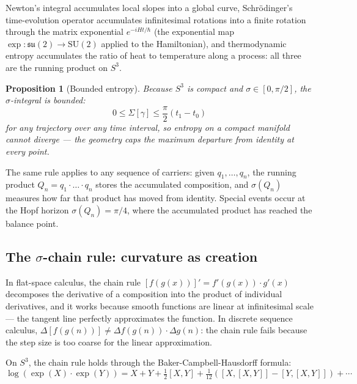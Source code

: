 \documentclass[12pt]{article}
\newtheorem{proposition}[theorem]{Proposition}
\begin{document}
Newton's integral accumulates local slopes into a global curve, Schr\"odinger's time-evolution operator accumulates infinitesimal rotations into a finite rotation through the matrix exponential $e^{-iHt/\hbar}$ (the exponential map $\exp: \mathfrak{su}(2) \to \mathrm{SU}(2)$ applied to the Hamiltonian), and thermodynamic entropy accumulates the ratio of heat to temperature along a process: all three are the running product on $S^3$.

\begin{proposition}[Bounded entropy]
    Because $S^3$ is compact and $\sigma \in [0, \pi/2]$, the $\sigma$-integral is bounded:
    \begin{equation}
        0 \leq \Sigma[\gamma] \leq \frac{\pi}{2}(t_1 - t_0)
    \end{equation}
    for any trajectory over any time interval, so entropy on a compact manifold cannot diverge --- the geometry caps the maximum departure from identity at every point.
\end{proposition}

The same rule applies to any sequence of carriers: given $q_1,\ldots,q_n$, the running product $Q_n = q_1\cdot\ldots\cdot q_n$ stores the accumulated composition, and $\sigma(Q_n)$ measures how far that product has moved from identity. Special events occur at the Hopf horizon $\sigma(Q_n)=\pi/4$, where the accumulated product has reached the balance point.

\subsection{The $\sigma$-chain rule: curvature as creation}

In flat-space calculus, the chain rule $[f(g(x))]' = f'(g(x)) \cdot g'(x)$ decomposes the derivative of a composition into the product of individual derivatives, and it works because smooth functions are linear at infinitesimal scale --- the tangent line perfectly approximates the function. In discrete sequence calculus, $\Delta[f(g(n))] \neq \Delta f(g(n)) \cdot \Delta g(n)$: the chain rule fails because the step size is too coarse for the linear approximation.

On $S^3$, the chain rule holds through the Baker-Campbell-Hausdorff formula:
\begin{equation}\label{eq:bch}
    \log(\exp(X) \cdot \exp(Y)) = X + Y + \tfrac{1}{2}[X,Y] + \tfrac{1}{12}([X,[X,Y]] - [Y,[X,Y]]) + \cdots
\end{equation}
\end{document}
